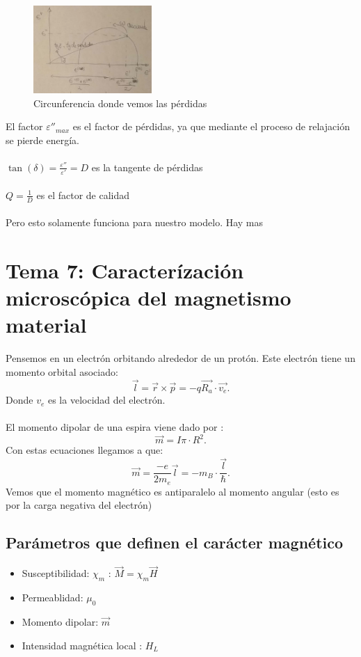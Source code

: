 \begin{figure}[H]
    \centering
    \includegraphics[width=0.4\textwidth]{img/perdidas.png}
    \caption{Circunferencia donde vemos las pérdidas}
    \label{fig:img-perdidas-png}
\end{figure}
El factor $\varepsilon''_{max}$ es el factor de pérdidas, ya que mediante el proceso de relajación se pierde energía. \\
\\
$\tan\left( \delta \right) = \frac{\varepsilon''}{\varepsilon'}=D$ es la tangente de pérdidas\\
\\
$Q=\frac{1}{D}$ es el factor de calidad\\
\\
Pero esto solamente funciona para nuestro modelo. Hay mas
\section{Tema 7: Caracterízación microscópica del magnetismo material}
Pensemos en un electrón orbitando alrededor de un protón. Este electrón tiene un momento orbital asociado:
\[
\vec{l}= \vec{r}\times \vec{p}= -q \vec{R_a}\cdot \vec{v_e}
.\] 
Donde $v_e$ es la velocidad del electrón. \\
\\
El momento dipolar de una espira viene dado por :
 \[
\vec{m}= I\pi \cdot R^2
.\] 
Con estas ecuaciones llegamos a que:
\[
\boxed{\vec{m}= \frac{-e}{2m_e}\vec{l}= -m_B\cdot \frac{\vec{l}}{\hbar }}
.\] 
Vemos que el momento magnético es antiparalelo al momento angular (esto es por la carga negativa del electrón)

\subsection{Parámetros que definen el carácter magnético}
\begin{itemize}
    \item Susceptibilidad: $\chi_m$ : $\vec{M}=\chi_m \vec{H}$
    \item Permeablidad: $\mu_0$
    \item Momento dipolar: $\vec{m}$ 
    \item Intensidad magnética local : $H_L$    
\end{itemize}
